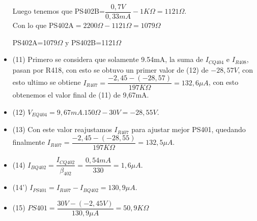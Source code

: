 \documentclass[12pt]{book}
\begin{document}
\begin{itemize}
Luego tenemos que PS402B=$\dfrac{0,7V}{0,33mA}-1K\Omega=1121\Omega$.\\
Con lo que PS402A$=2200\Omega-1121\Omega=1079\Omega$
\begin{center}
PS402A=1079$\Omega$  y  PS402B=1121$\Omega$
\end{center}
\item (11) Primero se considera que solamente 9.54mA, la suma de $I_{CQ404}$ e $I_{R408}$, pasan por R418, con esto se obtuvo un primer valor de (12) de $-28,57V$, con esto ultimo se obtiene $I_{R407}=\dfrac{-2,45-(-28,57)}{197K\Omega}=132,6\mu A$, con esto obtenemos el valor final de (11) de 9,67mA.
\item (12) $V_{EQ404}=9,67mA . 150\Omega-30V=-28,55V$.
\item (13) Con este valor reajustamos $I_{R407}$ para ajustar mejor PS401, quedando finalmente  $I_{R407}=\dfrac{-2,45-(-28,55)}{197K\Omega}=132,5\mu A$.
\item (14) $I_{BQ402}=\dfrac{I_{CQ402}}{\beta_{402}}=\dfrac{0,54mA}{330}=1,6\mu A$.
\item (14') $I_{PS401}=I_{R407}-I_{BQ402}=130,9\mu A$.
\item (15) $PS401=\dfrac{30V-(-2,45V)}{130,9\mu A}=50,9K\Omega$
\end{itemize}
\end{document}
